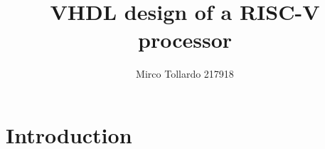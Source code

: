 \documentclass[a4paper, twocolumn, tikz]{IEEEtran}
\title{VHDL design of a RISC-V processor}
\author{Mirco Tollardo 217918}
\date{}
\begin{document}
\maketitle
\section{Introduction}
\end{document}
